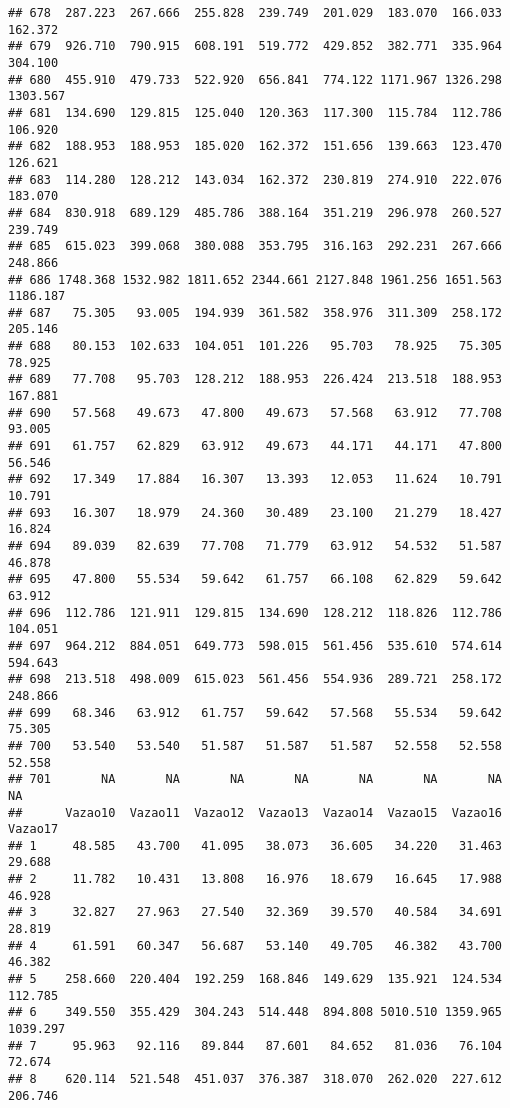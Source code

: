 \documentclass[
]{article}
\begin{document}
\begin{verbatim}
## 678  287.223  267.666  255.828  239.749  201.029  183.070  166.033  162.372
## 679  926.710  790.915  608.191  519.772  429.852  382.771  335.964  304.100
## 680  455.910  479.733  522.920  656.841  774.122 1171.967 1326.298 1303.567
## 681  134.690  129.815  125.040  120.363  117.300  115.784  112.786  106.920
## 682  188.953  188.953  185.020  162.372  151.656  139.663  123.470  126.621
## 683  114.280  128.212  143.034  162.372  230.819  274.910  222.076  183.070
## 684  830.918  689.129  485.786  388.164  351.219  296.978  260.527  239.749
## 685  615.023  399.068  380.088  353.795  316.163  292.231  267.666  248.866
## 686 1748.368 1532.982 1811.652 2344.661 2127.848 1961.256 1651.563 1186.187
## 687   75.305   93.005  194.939  361.582  358.976  311.309  258.172  205.146
## 688   80.153  102.633  104.051  101.226   95.703   78.925   75.305   78.925
## 689   77.708   95.703  128.212  188.953  226.424  213.518  188.953  167.881
## 690   57.568   49.673   47.800   49.673   57.568   63.912   77.708   93.005
## 691   61.757   62.829   63.912   49.673   44.171   44.171   47.800   56.546
## 692   17.349   17.884   16.307   13.393   12.053   11.624   10.791   10.791
## 693   16.307   18.979   24.360   30.489   23.100   21.279   18.427   16.824
## 694   89.039   82.639   77.708   71.779   63.912   54.532   51.587   46.878
## 695   47.800   55.534   59.642   61.757   66.108   62.829   59.642   63.912
## 696  112.786  121.911  129.815  134.690  128.212  118.826  112.786  104.051
## 697  964.212  884.051  649.773  598.015  561.456  535.610  574.614  594.643
## 698  213.518  498.009  615.023  561.456  554.936  289.721  258.172  248.866
## 699   68.346   63.912   61.757   59.642   57.568   55.534   59.642   75.305
## 700   53.540   53.540   51.587   51.587   51.587   52.558   52.558   52.558
## 701       NA       NA       NA       NA       NA       NA       NA       NA
##      Vazao10  Vazao11  Vazao12  Vazao13  Vazao14  Vazao15  Vazao16  Vazao17
## 1     48.585   43.700   41.095   38.073   36.605   34.220   31.463   29.688
## 2     11.782   10.431   13.808   16.976   18.679   16.645   17.988   46.928
## 3     32.827   27.963   27.540   32.369   39.570   40.584   34.691   28.819
## 4     61.591   60.347   56.687   53.140   49.705   46.382   43.700   46.382
## 5    258.660  220.404  192.259  168.846  149.629  135.921  124.534  112.785
## 6    349.550  355.429  304.243  514.448  894.808 5010.510 1359.965 1039.297
## 7     95.963   92.116   89.844   87.601   84.652   81.036   76.104   72.674
## 8    620.114  521.548  451.037  376.387  318.070  262.020  227.612  206.746

\end{verbatim}
\end{document}
